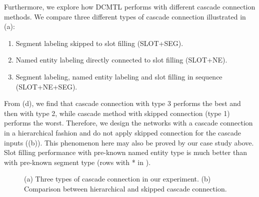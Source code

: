 Furthermore, 
we explore how DCMTL performs with different cascade connection methods.
We compare three different types of cascade connection 
illustrated in (a):
\begin{enumerate}[1.]
\item Segment labeling skipped to slot filling (SLOT+SEG).
\item Named entity labeling directly connected to slot filling (SLOT+NE).
\item Segment labeling, named entity labeling and slot filling in sequence (SLOT+NE+SEG).
\end{enumerate}
From (d),
we find that cascade connection with type 3 
performs the best
and then with type 2,
while cascade method with skipped connection (type 1) performs the worst.
Therefore, we design the networks 
with a cascade connection in a hierarchical fashion
and do not apply skipped connection for the cascade 
inputs ((b)).
This phenomenon here may also be proved by our case study above.
Slot filling performance with pre-known named entity type is 
much better than with pre-known segment type
(rows with * in ).
\begin{figure}[h]
	\centering
	\caption{(a) Three types of cascade connection in our experiment.
			(b) Comparison between hierarchical and skipped cascade connection.}
	\label{fig:cascade_connection_type}
	\vspace{-10pt}
\end{figure}
